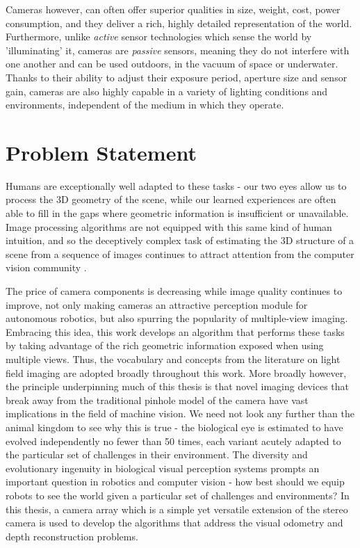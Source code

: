 \documentclass[openany]{book}
\begin{document}
Cameras however, can often offer superior qualities in size, weight, cost, power consumption, and they deliver a rich, highly detailed representation of the world. Furthermore, unlike \textit{active} sensor technologies which sense the world by 'illuminating' it, cameras are \textit{passive} sensors, meaning they do not interfere with one another and can be used outdoors, in the vacuum of space or underwater. Thanks to their ability to adjust their exposure period, aperture size and sensor gain, cameras are also highly capable in a variety of lighting conditions and environments, independent of the medium in which they operate.


\section{Problem Statement}
Humans are exceptionally well adapted to these tasks - our two eyes allow us to process the 3D geometry of the scene, while our learned experiences are often able to fill in the gaps where geometric information is insufficient or unavailable. Image processing algorithms are not equipped with this same kind of human intuition, and so the deceptively complex task of estimating the 3D structure of a scene from a sequence of images continues to attract attention from the computer vision community \cite{dansereau2011plenopticflow,nister2004vo,gakne2018scale,zhou2019scale}. 

The price of camera components is decreasing while image quality continues to improve, not only making cameras an attractive perception module for autonomous robotics, but also spurring the popularity of multiple-view imaging. Embracing this idea, this work develops an algorithm that performs these tasks by taking advantage of the rich geometric information exposed when using multiple views. Thus, the vocabulary and concepts from the literature on light field imaging are adopted broadly throughout this work. More broadly however, the principle underpinning much of this thesis is that novel imaging devices that break away from the traditional pinhole model of the camera have vast implications in the field of machine vision. We need not look any further than the animal kingdom to see why this is true - the biological eye is estimated to have evolved independently no fewer than 50 times, each variant acutely adapted to the particular set of challenges in their environment. The diversity and evolutionary ingenuity in biological visual perception systems prompts an important question in robotics and computer vision - how best should we equip robots to see the world given a particular set of challenges and environments? In this thesis, a camera array which is a simple yet versatile extension of the stereo camera is used to develop the algorithms that address the visual odometry and depth reconstruction problems. 
\end{document}
